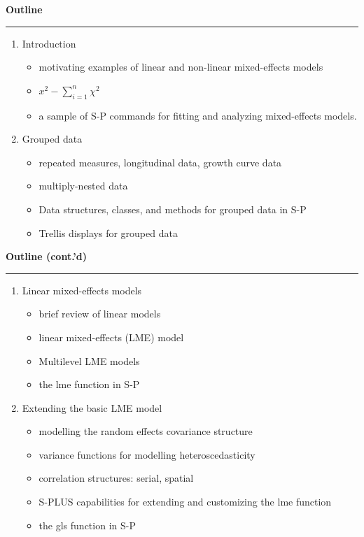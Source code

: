 \documentclass[a4,semhelv,semcolor,portrait,11pt]{seminar}
\newcommand{\Ti}[1]{\hfill {\textbf{\large \blue  #1}\\}%
  \vspace*{-1cm} \rule{\linewidth}{0.2mm}}
\newcommand{\mg}[1]{{\magenta #1}}
\newcommand{\rd}[1]{{\red #1}}
\newcommand{\splus}{{S-P\sc{lus}} \mbox{}}
\newcommand{\spc}{$\mbox{}$}
\begin{document}
\begin{slide*}
  \Ti{Outline}
  \begin{enumerate}
    \item \rd{Introduction}
    \begin{itemize}
    \item motivating examples of \mg{linear} and \mg{non-linear}
      mixed-effects models 
   \item   $x^{2} - \sum_{i=1}^{n}\chi^{2}$
    \item a sample of \splus commands for \mg{fitting} and
      \mg{analyzing} mixed-effects models. 
    \end{itemize}
  \item \rd{Grouped data}
    \begin{itemize}
    \item \spc \mg{repeated measures}, \mg{longitudinal} data, \mg{growth
        curve} data 
    \item  \spc \mg{multiply-nested} data
    \item Data structures, \mg{classes}, and \mg{methods} for grouped
      data in \splus
    \item \spc \mg{Trellis} displays for grouped data
    \end{itemize}
  \end{enumerate}
\end{slide*}
\begin{slide*}
  \Ti{Outline (cont.'d)}
  \begin{enumerate}
  \item[3.] \rd{Linear mixed-effects models}
    \begin{itemize}
    \item brief review of linear models
    \item linear mixed-effects (\mg{LME}) model
    \item \spc \mg{Multilevel} LME models
    \item the \mg{lme} function in \splus
    \end{itemize}
  \item[4.] \rd{Extending the basic LME model}
    \begin{itemize}
    \item modelling the random effects \mg{covariance} structure
    \item variance functions for modelling \mg{heteroscedasticity}
    \item correlation structures: \mg{serial}, \mg{spatial}
    \item  S-PLUS capabilities for extending and customizing the
      \mg{lme} function
    \item the \mg{gls} function in \splus
    \end{itemize}
  \end{enumerate}
\end{slide*}
\end{document}
